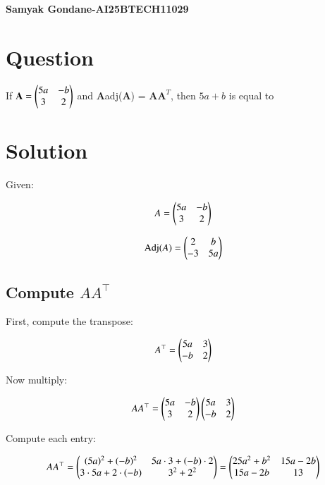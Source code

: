 \documentclass{article}
\begin{document}
\begin{center}
\large
    \textbf{Samyak Gondane-AI25BTECH11029}
\end{center}
\date{}

\section*{Question}
If $\textbf{A} = \begin{pmatrix}5a & -b \\ 3 & 2\end{pmatrix}$ and \textbf{A}adj(\textbf{A}) = \textbf{A}$\textbf{A}^T$, then $5a + b$ is equal to


\section*{Solution}

Given:

\begin{align}
A = \begin{pmatrix} 5a & -b \\ 3 & 2 \end{pmatrix}
\end{align}


\begin{align}
\text{Adj}(A) = \begin{pmatrix} 2 & b \\ -3 & 5a \end{pmatrix}
\end{align}



\subsection*{Compute $AA^\top$}

First, compute the transpose:


\begin{align}
A^\top = \begin{pmatrix} 5a & 3 \\ -b & 2 \end{pmatrix}
\end{align}



Now multiply:


\begin{align}
AA^\top = \begin{pmatrix} 5a & -b \\ 3 & 2 \end{pmatrix} \begin{pmatrix} 5a & 3 \\ -b & 2 \end{pmatrix}
\end{align}



Compute each entry:


\begin{align}
AA^\top = \begin{pmatrix}
(5a)^2 + (-b)^2 & 5a \cdot 3 + (-b) \cdot 2 \\
3 \cdot 5a + 2 \cdot (-b) & 3^2 + 2^2
\end{pmatrix}
= \begin{pmatrix}
25a^2 + b^2 & 15a - 2b \\
15a - 2b & 13
\end{pmatrix}
\end{align}
\end{document}
